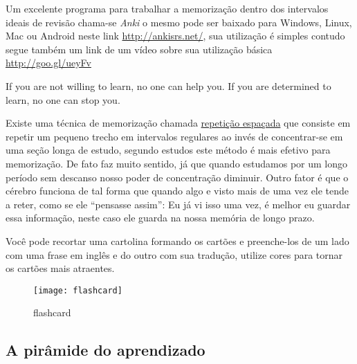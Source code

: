 \noindent
Um excelente programa para trabalhar a memorização dentro dos intervalos
ideais de revisão chama-se \emph{Anki} o mesmo pode ser baixado para
Windows, Linux, Mac ou Android neste link \href{http://ankisrs.net/}{http://ankisrs.net/},
sua utilização é simples contudo segue também um link de um vídeo
sobre sua utilização básica \href{http://goo.gl/ueyFv}{http://goo.gl/ueyFv}

\vspace{0.3cm}  \vspace{0.5\baselineskip}

\noindent
{\footnotesize {} If you are not willing to learn, no one can help you. If you are
determined to learn, no one can stop you. }
\vspace{0.3\baselineskip}

\noindent
Existe uma técnica de memorização chamada \href{http://goo.gl/Y5pRj}{repetição espaçada}
que consiste em repetir um pequeno trecho em intervalos regulares ao invés de
concentrar-se em uma seção longa de estudo, segundo estudos este
método é mais efetivo para memorização. De fato faz muito sentido, já
que quando estudamos por um longo período sem descanso nosso poder
de concentração diminuir. Outro fator é que o cérebro funciona de tal
forma que quando algo e visto mais de uma vez ele tende a reter, como
se ele ``pensasse assim'': Eu já vi isso uma vez, é melhor eu guardar
essa informação, neste caso ele guarda na nossa memória de longo prazo.

\vspace{0.3\baselineskip}
\noindent
Você pode recortar uma cartolina formando os cartões e preenche-los
de um lado com uma frase em inglês e do outro com sua tradução,
utilize cores para tornar os cartões mais atraentes.


\newpage
\begin{figure}[h!]
	\centering
	\texttt{[image: flashcard]}
	\caption{flashcard}
\end{figure}



\subsection{A pirâmide do aprendizado}
\label{sub:a_pir_mide_do_aprendizado}

